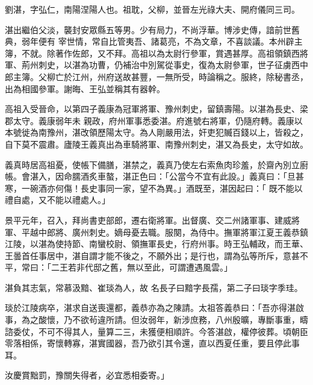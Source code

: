 
\begin{pinyinscope}

 劉湛，字弘仁，南陽涅陽人也。祖耽，父柳，並晉左光祿大夫、開府儀同三司。



 湛出繼伯父淡，襲封安眾縣五等男。少有局力，不尚浮華。博涉史傳，諳前世舊典，弱年便有
 宰世情，常自比管夷吾、諸葛亮，不為文章，不喜談議。本州辟主簿，不就。除著作佐郎，又不拜。高祖以為太尉行參軍，賞遇甚厚。高祖領鎮西將軍、荊州刺史，以湛為功曹，仍補治中別駕從事史，復為太尉參軍，世子征虜西中郎主簿。父柳亡於江州，州府送故甚豐，一無所受，時論稱之。服終，除秘書丞，出為相國參軍。謝晦、王弘並稱其有器幹。



 高祖入受晉命，以第四子義康為冠軍將軍、豫州刺史，留鎮壽陽。以湛為長史、梁郡太守。義康弱年未
 親政，府州軍事悉委湛。府進號右將軍，仍隨府轉。義康以本號徙為南豫州，湛改領歷陽太守。為人剛嚴用法，奸吏犯贓百錢以上，皆殺之，自下莫不震肅。廬陵王義真出為車騎將軍、南豫州刺史，湛又為長史，太守如故。



 義真時居高祖憂，使帳下備膳，湛禁之，義真乃使左右索魚肉珍羞，於齋內別立廚帳。會湛入，因命臑酒炙車螯，湛正色曰：「公當今不宜有此設。」義真曰：「旦甚寒，一碗酒亦何傷！長史事同一家，望不為異。」酒既至，湛因起曰：「
 既不能以禮自處，又不能以禮處人。」



 景平元年，召入，拜尚書吏部郎，遷右衛將軍。出督廣、交二州諸軍事、建威將軍、平越中郎將、廣州刺史。嫡母憂去職。服闋，為侍中。撫軍將軍江夏王義恭鎮江陵，以湛為使持節、南蠻校尉、領撫軍長史，行府州事。時王弘輔政，而王華、王曇首任事居中，湛自謂才能不後之，不願外出；是行也，謂為弘等所斥，意甚不平，常曰：「二王若非代邸之舊，無以至此，可謂遭遇風雲。」



 湛負其志氣，常慕汲黯、崔琰為人，故
 名長子曰黯字長孺，第二子曰琰字季珪。



 琰於江陵病卒，湛求自送喪還都，義恭亦為之陳請。太祖答義恭曰：「吾亦得湛啟事，為之酸懷，乃不欲茍違所請。但汝弱年，新涉庶務，八州殷曠，專斷事重，疇諮委仗，不可不得其人，量算二三，未獲便相順許。今答湛啟，權停彼葬。頃朝臣零落相係，寄懷轉寡，湛實國器，吾乃欲引其令還，直以西夏任重，要且停此事耳。



 汝慶賞黜罰，豫關失得者，必宜悉相委寄。」




\end{pinyinscope}
